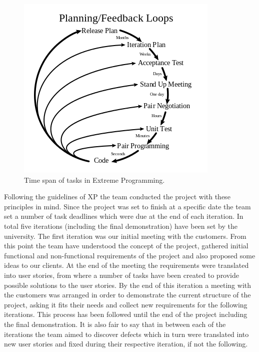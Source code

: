 \documentclass{l3proj}
\begin{document}
\begin{figure}
\includegraphics[width=1.1\linewidth]{figures/Extreme_Programming}
\caption{Time span of tasks in Extreme Programming.}
\label{fig:extreme-programming}
\end{figure}

Following the guidelines of XP the team conducted the project with these principles in mind. Since the project was set to finish at a specific date
the team set a number of task deadlines which were due at the end of each iteration. In total five iterations
(including the final demonstration) have been set by the university. The first iteration was our initial meeting with
the customers. From this point the team have understood the concept of the project, gathered initial functional and non-functional
requirements of the project and also proposed some ideas to our clients. At the end of the meeting the requirements were
translated into user stories, from where a number of tasks have been created to provide possible solutions to the user stories.
By the end of this iteration a meeting with the customers was arranged in order to demonstrate the current structure of the
project, asking it fits their needs and collect new requirements for the following iterations. This process has been followed
until the end of the project including the final demonstration. It is also fair to say that in between each of the iterations the team
aimed to discover defects which in turn were translated into new user stories and fixed during their respective iteration,
if not the following.
\end{document}
